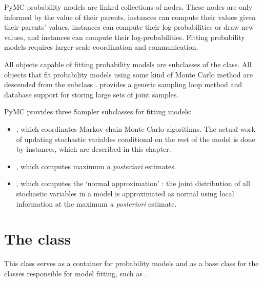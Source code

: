 PyMC probability models are linked collections of nodes. These nodes are only informed by the value of their parents.  instances can compute their values given their parents' values,  instances can compute their log-probabilities or draw new values, and  instances can compute their log-probabilities. Fitting probability models requires larger-scale coordination and communication.

All objects capable of fitting probability models are subclasses of the  class. All objects that fit probability models using some kind of Monte Carlo method are descended from the  subclass .  provides a generic sampling loop method and database support for storing large sets of joint samples. %

PyMC provides three Sampler subclasses for fitting models:
\begin{itemize}
    \item {}, which coordinates Markov chain Monte Carlo algorithms. The actual work of updating stochastic variables conditional on the rest of the model is done by  instances, which are described in this chapter.
    \item {}, which computes maximum \emph{a posteriori} estimates.
    \item {}, which computes the `normal approximation' \cite{gelman}: the joint distribution of all stochastic variables in a model is approximated as normal using local information at the maximum \emph{a posteriori} estimate.
\end{itemize}

\hypertarget{model}{}
\section*{The  class} \label{sec:Model}
This class serves as a container for probability models and as a base class for the classes responsible for model fitting, such as .

